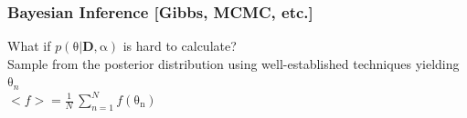 \documentclass{beamer}
\newcommand{\greekbf}[1]{\boldsymbol{\mathrm{#1}}}
\begin{document}
\begin{frame}
  \frametitle{Bayesian Inference [Gibbs, MCMC, etc.]}
  \Large
  What if $p(\greekbf{\theta}|\mathbf{D},\greekbf{\alpha})$ is hard to calculate?\\
  \pause
  \vspace{.75cm}
  Sample from the posterior distribution using well-established techniques yielding $\greekbf{\theta}_n$\\
  \pause
  \vspace{.75cm}
  $<f> = \frac{1}{N} \, \sum_{n=1}^{N} f(\greekbf{\theta_n})$\\
\end{frame}
\end{document}
